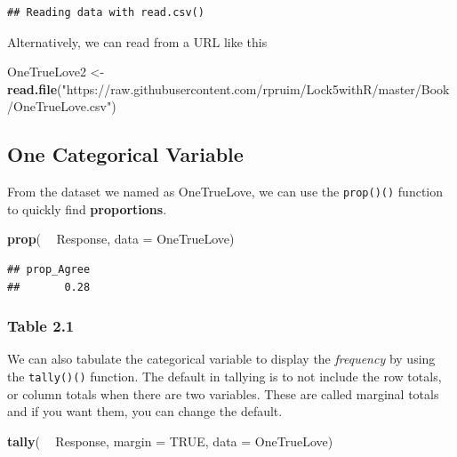 \documentclass[]{book}
\newenvironment{Shaded}{\begin{snugshade}}{\end{snugshade}}
\newcommand{\DataTypeTok}[1]{\textcolor[rgb]{0.13,0.29,0.53}{#1}}
\newcommand{\KeywordTok}[1]{\textcolor[rgb]{0.13,0.29,0.53}{\textbf{#1}}}
\newcommand{\NormalTok}[1]{#1}
\newcommand{\OperatorTok}[1]{\textcolor[rgb]{0.81,0.36,0.00}{\textbf{#1}}}
\newcommand{\OtherTok}[1]{\textcolor[rgb]{0.56,0.35,0.01}{#1}}
\newcommand{\StringTok}[1]{\textcolor[rgb]{0.31,0.60,0.02}{#1}}
\begin{document}
\begin{verbatim}
## Reading data with read.csv()
\end{verbatim}

Alternatively, we can read from a URL like this

\begin{Shaded}
\begin{Highlighting}[]
\NormalTok{OneTrueLove2 <-}\StringTok{ }
\StringTok{  }\KeywordTok{read.file}\NormalTok{(}\StringTok{"https://raw.githubusercontent.com/rpruim/Lock5withR/master/Book/OneTrueLove.csv"}\NormalTok{)}
\end{Highlighting}
\end{Shaded}

\hypertarget{one-categorical-variable}{%
\subsection{One Categorical Variable}\label{one-categorical-variable}}

From the dataset we named as {OneTrueLove}, we can use the \texttt{prop()()} function to quickly find \textbf{proportions}.

\begin{Shaded}
\begin{Highlighting}[]
\KeywordTok{prop}\NormalTok{( }\OperatorTok{~}\StringTok{ }\NormalTok{Response, }\DataTypeTok{data =}\NormalTok{ OneTrueLove)}
\end{Highlighting}
\end{Shaded}

\begin{verbatim}
## prop_Agree 
##       0.28
\end{verbatim}

\hypertarget{table-2.1}{%
\subsubsection{Table 2.1}\label{table-2.1}}

We can also tabulate the categorical variable to display the \emph{frequency} by using the \texttt{tally()()} function. The default in tallying is to not include the row totals, or column totals when there are two variables. These are called marginal totals and if you want them, you can change the default.

\begin{Shaded}
\begin{Highlighting}[]
\KeywordTok{tally}\NormalTok{( }\OperatorTok{~}\StringTok{ }\NormalTok{Response, }\DataTypeTok{margin =} \OtherTok{TRUE}\NormalTok{, }\DataTypeTok{data =}\NormalTok{ OneTrueLove)}
\end{Highlighting}
\end{Shaded}
\end{document}
